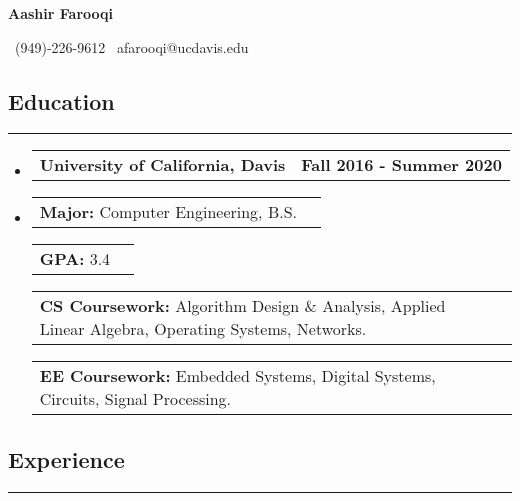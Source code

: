 \documentclass[10pt,letterpaper]{article}
\makeatletter
\newcommand{\items}[2]
{
	\begin{tabular*}{\linewidth}{l @{\extracolsep{\fill}} r}
		#1 & #2 \\
	\end{tabular*}
}
\newcommand{\header}[2]
{
	\begin{tabular*}{\linewidth}{l @{\extracolsep{\fill}} r}
		\hspace{-27pt} #1 & #2 \\
	\end{tabular*}
}
\newcommand{\sectionbreak}
{
	\vspace{-1.2em}
	\rule{\textwidth}{1.7pt}
	\vspace{-1.7em}
}
\makeatother
\begin{document}
\begin{center}
	{\LARGE \textbf{Aashir Farooqi}}

	\vspace{0.5em}
	\ (949)-226-9612 \textbar 
	\ afarooqi@ucdavis.edu\textbar
	\ \href{https://www.linkedin.com/in/aashir-farooqi-4b067b139/}{\emph{\underline{}}}
	\\
\end{center}
\vspace{-20pt}


\subsection*{Education}
\sectionbreak

\begin{itemize}

	\item[] 
		\header
		{\textbf{University of California, Davis}}
		{\textbf{Fall 2016 - Summer 2020}}
	\item[]
		\vspace{-2.5pt}
	\items
		{\textbf{Major:} Computer Engineering, B.S.}
		{}
	\items
		{\textbf{GPA:} 3.4}
		{}
	\items
		{\textbf{CS Coursework:} Algorithm Design \& Analysis, Applied Linear Algebra, Operating Systems, Networks.}
		{}
	\items
		{\textbf{EE Coursework:} Embedded Systems, Digital Systems, Circuits, Signal Processing.}
		{}
		{\vspace{-0.6em}}

\end{itemize}

\vspace{-24.65pt}

\subsection*{Experience}
\sectionbreak
\end{document}
